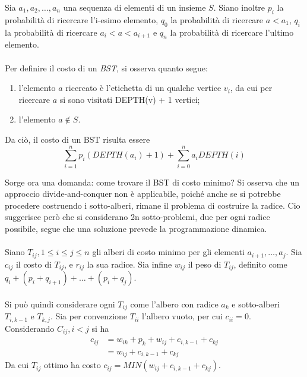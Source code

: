 \documentclass{subfiles}
\begin{document}
Sia \(a_{1}, a_{2}, \ldots, a_{n}\) una sequenza di elementi di un insieme \(S\). Siano inoltre \(p_{i}\) la probabilità di ricercare l'i-esimo elemento,
\(q_{0}\) la probabilità di ricercare \(a < a_{1}\), \(q_{i}\) la probabilità di ricercare \(a_{i} < a < a_{i + 1}\) e \(q_{n}\) la probabilità di ricercare l'ultimo elemento.
\\ \\
Per definire il costo di un \emph{BST}, si osserva quanto segue:
\begin{enumerate}
    \item l'elemento \(a\) ricercato è l'etichetta di un qualche vertice \(v_{i}\), da cui per ricercare \(a\) si sono visitati DEPTH(v) + 1 vertici;
    \item l'elemento \(a \notin S\).
\end{enumerate}

\noindent Da ciò, il costo di un BST risulta essere
\[
    \sum\limits_{i = 1}^{n}{p_{i}(DEPTH(a_{i}) + 1)} + \sum\limits_{i = 0}^{n}{a_{i}DEPTH(i)}
\]

\noindent Sorge ora una domanda: come trovare il BST di costo minimo?
Si osserva che un approccio divide-and-conquer non è applicabile, poiché anche se si potrebbe procedere costruendo i sotto-alberi, rimane il problema di costruire la radice.
Cio suggerisce però che si considerano 2n sotto-problemi, due per ogni radice possibile, segue che una soluzione prevede la programmazione dinamica.
\\ \\
Siano \(T_{ij}, 1 \le i \le j \le n\) gli alberi di costo minimo per gli elementi \(a_{i + 1}, \ldots, a_{j}\).
Sia \(c_{ij}\) il costo di \(T_{ij}\),  e \(r_{ij}\) la sua radice. Sia infine \(w_{ij}\) il peso di \(T_{ij}\),
definito come \(q_{i} + (p_{i} + q_{i + 1}) + \ldots + (p_{i} + q_{j})\).
\\ \\
Si può quindi considerare ogni \(T_{ij}\) come l'albero con radice \(a_{k}\) e sotto-alberi \(T_{i, k - 1}\) e \(T_{k, j}\).
Sia per convenzione \(T_{ii}\) l'albero vuoto, per cui \(c_{ii} = 0\).
\\
Considerando \(C_{ij}, i < j\) si ha
\[
    \begin{aligned}
        c_{ij} & = w_{ik} + p_{k} + w_{ij} + c_{i, k - 1} + c_{kj} \\
               & = w_{ij} + c_{i, k - 1} + c_{kj}
    \end{aligned}
\]
Da cui \(T_{ij}\) ottimo ha costo \(c_{ij} = MIN(w_{ij} + c_{i, k - 1} + c_{kj})\).
\end{document}
